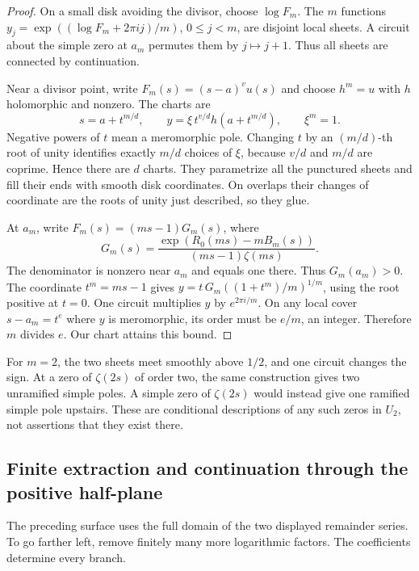 \begin{proof}
On a small disk avoiding the divisor, choose \(\log F_m\).
The \(m\) functions
\(y_j=\exp((\log F_m+2\pi i j)/m)\), \(0\leq j<m\), are disjoint
local sheets.  A circuit about the simple zero at \(a_m\) permutes them
by \(j\mapsto j+1\).  Thus all sheets are connected by continuation.

Near a divisor point, write \(F_m(s)=(s-a)^v u(s)\) and choose
\(h^m=u\) with \(h\) holomorphic and nonzero.  The charts are
\[
 s=a+t^{m/d},\qquad
 y=\xi\,t^{v/d}h(a+t^{m/d}),\qquad \xi^m=1.
\]
Negative powers of \(t\) mean a meromorphic pole.  Changing \(t\) by
an \((m/d)\)-th root of unity identifies exactly \(m/d\) choices of
\(\xi\), because \(v/d\) and \(m/d\) are coprime.  Hence there are
\(d\) charts.  They parametrize all the punctured sheets and fill their
ends with smooth disk coordinates.  On overlaps their changes of
coordinate are the roots of unity just described, so they glue.

At \(a_m\), write \(F_m(s)=(ms-1)G_m(s)\), where
\[
 G_m(s)=\frac{\exp(R_0(ms)-mB_m(s))}{(ms-1)\zeta(ms)}.
\]
The denominator is nonzero near \(a_m\) and equals one there.
Thus \(G_m(a_m)>0\).  The coordinate \(t^m=ms-1\) gives
\(y=t\,G_m((1+t^m)/m)^{1/m}\), using the root positive at \(t=0\).
One circuit multiplies \(y\) by \(e^{2\pi i/m}\).
On any local cover \(s-a_m=t^e\) where \(y\) is meromorphic,
its order must be \(e/m\), an integer.  Therefore \(m\) divides \(e\).
Our chart attains this bound.
\end{proof}

For \(m=2\), the two sheets meet smoothly above \(1/2\), and one
circuit changes the sign.  At a zero of \(\zeta(2s)\) of order two,
the same construction gives two unramified simple poles.
A simple zero of \(\zeta(2s)\) would instead give one ramified simple
pole upstairs.  These are conditional descriptions of any such zeros
in \(U_2\), not assertions that they exist there.

\subsection{Finite extraction and continuation through the positive half-plane}

The preceding surface uses the full domain of the two displayed remainder
series.  To go farther left, remove finitely many more logarithmic factors.
The coefficients determine every branch.

